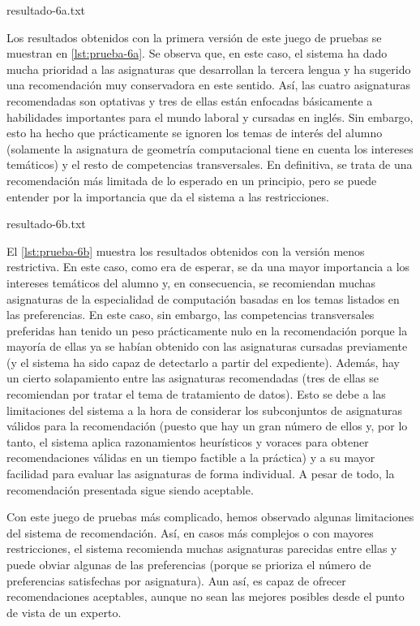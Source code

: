 %
    {resultado-6a.txt}

Los resultados obtenidos con la primera versión de este juego de pruebas se 
muestran en \autoref{lst:prueba-6a}. Se observa que, en este caso, el sistema 
ha dado mucha prioridad a las asignaturas que desarrollan la tercera lengua 
y ha sugerido una recomendación muy conservadora en este sentido. Así, las 
cuatro asignaturas recomendadas son optativas y tres de ellas están enfocadas 
básicamente a habilidades importantes para el mundo laboral y cursadas en 
inglés. Sin embargo, esto ha hecho que prácticamente se ignoren los temas de 
interés del alumno (solamente la asignatura de geometría computacional tiene 
en cuenta los intereses temáticos) y el resto de competencias transversales.
En definitiva, se trata de una recomendación más limitada de lo esperado en 
un principio, pero se puede entender por la importancia que da el sistema a 
las restricciones.

%
    {resultado-6b.txt}

El \autoref{lst:prueba-6b} muestra los resultados obtenidos con la versión 
menos restrictiva. En este caso, como era de esperar, se da una mayor 
importancia a los intereses temáticos del alumno y, en consecuencia, se 
recomiendan muchas asignaturas de la especialidad de computación basadas en 
los temas listados en las preferencias. En este caso, sin embargo, las 
competencias transversales preferidas han tenido un peso prácticamente nulo 
en la recomendación porque la mayoría de ellas ya se habían obtenido con 
las asignaturas cursadas previamente (y el sistema ha sido capaz de detectarlo 
a partir del expediente). Además, hay un cierto solapamiento entre las 
asignaturas recomendadas (tres de ellas se recomiendan por tratar el tema de 
tratamiento de datos). Esto se debe a las limitaciones del sistema a la hora 
de considerar los subconjuntos de asignaturas válidos para la recomendación 
(puesto que hay un gran número de ellos y, por lo tanto, el sistema aplica 
razonamientos heurísticos y voraces para obtener recomendaciones válidas en 
un tiempo factible a la práctica) y a su mayor facilidad para evaluar las 
asignaturas de forma individual. A pesar de todo, la recomendación presentada 
sigue siendo aceptable.

Con este juego de pruebas más complicado, hemos observado algunas limitaciones 
del sistema de recomendación. Así, en casos más complejos o con mayores 
restricciones, el sistema recomienda muchas asignaturas parecidas entre ellas 
y puede obviar algunas de las preferencias (porque se prioriza el número de 
preferencias satisfechas por asignatura). Aun así, es capaz de ofrecer 
recomendaciones aceptables, aunque no sean las mejores posibles desde el punto 
de vista de un experto.




